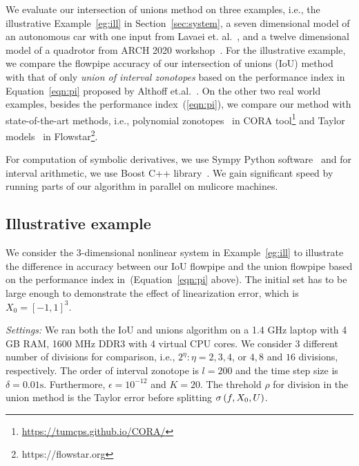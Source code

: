 We evaluate our intersection of unions method on three examples, i.e.,
the illustrative Example~\ref{eg:ill} in Section~\ref{sec:system}, a
seven dimensional model of an autonomous car with one input from Lavaei
et. al.~\cite{lavaei2020formal}, and a twelve dimensional model of a quadrotor
from ARCH 2020 workshop~\cite{geretti2020arch}.  For the illustrative
example, we compare the flowpipe accuracy of our intersection of
unions (IoU) method with that of only
\emph{union of interval zonotopes} based on the performance index in
Equation~\ref{eqn:pi} proposed by Althoff
et.al.~\cite{althoff2008reachability}.  
On the other two real world
examples, besides the performance index~(\ref{eqn:pi}), we compare our
method with state-of-the-art methods, i.e., polynomial
zonotopes~\cite{althoff2013reachability} in CORA
tool\footnote{\url{https://tumcps.github.io/CORA/}} and Taylor
models~\cite{chen2012taylor} in
Flowstar\footnote{https://flowstar.org}.


For computation of symbolic derivatives, we use Sympy Python
software~\cite{10.7717/peerj-cs.103} and for interval arithmetic, we
use Boost C++ library~\cite{bronnimann2006design}.  We gain
significant speed by running parts of our algorithm in
parallel on mulicore machines.

\subsection{Illustrative example}
We consider the 3-dimensional nonlinear system in Example~\ref{eg:ill}
to illustrate the difference in accuracy between our IoU flowpipe and
the union flowpipe based on the performance index
in~\cite{althoff2008reachability}(Equation~\ref{eqn:pi} above).  The
initial set has to be large enough to demonstrate the effect of linearization error, which is $X_0 = [-1,1]^3$.

\emph{Settings:}  We ran both the IoU and unions algorithm on a 1.4 GHz
laptop with 4 GB RAM, 1600 MHz DDR3 with 4 virtual CPU cores.  We
consider 3 different number of divisions for comparison, i.e.,
$2^\eta:\eta = 2, 3,4$, or $4, 8$ and $16$ divisions,
respectively. The order of interval zonotope is $l = 200$ and the time
step size is $\delta = 0.01\si{\second}$.  Furthermore, $\epsilon = 10^{-12}$
and $K = 20$.  The threhold $\rho$ for division in the union method is
the Taylor error before splitting $\sigma\left(f,X_0,U\right)$.

